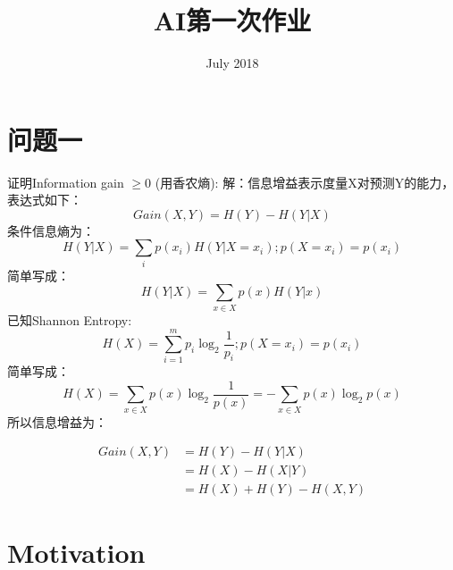 \documentclass{article}
\begin{document}
\title{AI第一次作业}

\date{July 2018}

\maketitle
{\tableofcontents}
\section{问题一}
证明Information gain $\ge 0$ (用香农熵):
解：信息增益表示度量X对预测Y的能力，表达式如下：
$$Gain(X,Y)=H(Y)-H(Y|X)$$
条件信息熵为：
$$H(Y|X)=\sum_{i}p(x_i)H(Y|X=x_i);p(X=x_i)=p(x_i)$$
简单写成：
$$H(Y|X)=\sum_{x\in X}p(x)H(Y|x)$$
已知Shannon Entropy:
$$H(X)=\sum_{i=1}^{m}p_i\log_2\frac{1}{p_i};p(X=x_i)=p(x_i)$$
简单写成：
$$H(X)=\sum_{x\in X}p(x)\log_2\frac{1}{p(x)}=-\sum_{x\in X}p(x)\log_2p(x)$$
所以信息增益为：

\begin{equation}\label{information gain}
\begin{aligned}
  Gain(X,Y)&=H(Y)-H(Y|X)\\
  &=H(X)-H(X|Y)\\
  &=H(X)+H(Y)-H(X,Y)
\end{aligned}
\end{equation}

\section{Motivation}
\end{document}
